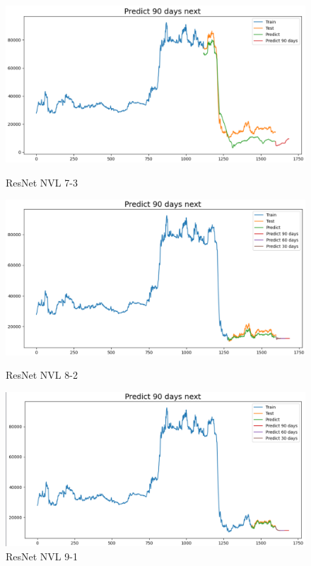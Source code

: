 \documentclass[conference]{IEEEtran}
\begin{document}
\begin{enumerate}
\begin{figure}[htbp]
    \begin{minipage}{0.23\textwidth}
    \centering
    \includegraphics[width=1\textwidth]{experiment/resnet/NVL 7_3.png}
    \caption{ResNet NVL 7-3}
    \label{fig:nvl_boxplot}
    \end{minipage}
    \hfill
    \begin{minipage}{0.23\textwidth}
    \centering
    \includegraphics[width=1\textwidth]{experiment/resnet/NVL 8_2.png}
    \caption{ResNet NVL 8-2}
    \label{fig:nvl_histogram}
    \end{minipage}
    \begin{minipage}{0.23\textwidth}
    \centering
    \includegraphics[width=1\textwidth]{experiment/resnet/NVL 9_1.png}
    \caption{ResNet NVL 9-1}
    \label{fig:nvl_histogram}
    \end{minipage}
\end{figure}




\end{enumerate}
\end{document}
